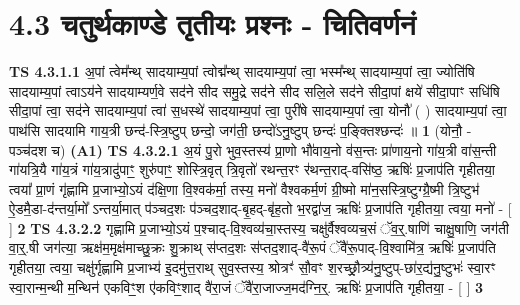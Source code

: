 \documentclass[17pt]{extarticle}
\begin{document}
     \section*{ 4.3      चतुर्थकाण्डे तृतीयः प्रश्नः - चितिवर्णनं }
                                        \textbf{ TS 4.3.1.1} \newline
                  अ॒पां त्वेम᳚न्थ् सादयाम्य॒पां त्वोद्म᳚न्थ् सादयाम्य॒पां त्वा॒ भस्म᳚न्थ् सादयाम्य॒पां त्वा॒ ज्योति॑षि सादयाम्य॒पां त्वाऽय॑ने सादयाम्यर्ण॒वे सद॑ने सीद समु॒द्रे सद॑ने सीद सलि॒ले सद॑ने सीदा॒पां क्षये॑ सीदा॒पाꣳ सधि॑षि सीदा॒पां त्वा॒ सद॑ने सादयाम्य॒पां त्वा॑ स॒धस्थे॑ सादयाम्य॒पां त्वा॒ पुरी॑षे सादयाम्य॒पां त्वा॒ योनौ॑ ( ) सादयाम्य॒पां त्वा॒ पाथ॑सि सादयामि गाय॒त्री छन्द॑-स्त्रि॒ष्टुप् छन्दो॒ जग॑ती॒ छन्दो॑ऽनु॒ष्टुप् छन्दः॑ प॒ङ्क्तिश्छन्दः॑ ॥ \textbf{  1 } \newline
                  \newline
                      (योनौ॒ - पञ्च॑दश च)  \textbf{(A1)} \newline \newline
                                        \textbf{ TS 4.3.2.1} \newline
                  अ॒यं पु॒रो भुव॒स्तस्य॑ प्रा॒णो भौ॑वाय॒नो व॑स॒न्तः प्रा॑णाय॒नो गा॑य॒त्री वा॑स॒न्ती गा॑यत्रि॒यै गा॑य॒त्रं गा॑य॒त्रादु॑पाꣳ॒॒ शुरु॑पाꣳ॒॒ शोस्त्रि॒वृत् त्रि॒वृतो॑ रथन्त॒रꣳ र॑थन्त॒राद्-वसि॑ष्ठ॒ ऋषिः॑ प्र॒जाप॑ति गृहीतया॒ त्वया᳚ प्रा॒णं गृ॑ह्णामि प्र॒जाभ्यो॒ऽयं द॑क्षि॒णा वि॒श्वक॑र्मा॒ तस्य॒ मनो॑ वैश्वकर्म॒णं ग्री॒ष्मो मा॑न॒सस्त्रि॒ष्टुग्ग्रै॒ष्मी त्रि॒ष्टुभ॑ ऐ॒डमै॒डा-द॑न्तर्या॒मो᳚ ऽन्तर्या॒मात् प॑ञ्चद॒शः प॑ञ्चद॒शाद्-बृ॒हद्-बृ॑ह॒तो भ॒रद्वा॑ज॒ ऋषिः॑ प्र॒जाप॑ति गृहीतया॒ त्वया॒ मनो॑ - [  ] \textbf{  2} \newline
                  \newline
                                \textbf{ TS 4.3.2.2} \newline
                  गृह्णामि प्र॒जाभ्यो॒ऽयं प॒श्चाद्-वि॒श्वव्य॑चा॒स्तस्य॒ चक्षु॑र्वैश्वव्यच॒सं ॅव॒र्॒.षाणि॑ चाक्षु॒षाणि॒ जग॑ती वा॒र्॒.षी जग॑त्या॒ ऋक्ष॑म॒मृक्ष॑माच्छु॒क्रः शु॒क्राथ् स॑प्तद॒शः स॑प्तद॒शाद्-वै॑रू॒पं ॅवै॑रू॒पाद्-वि॒श्वामि॑त्र॒ ऋषिः॑ प्र॒जाप॑ति गृहीतया॒ त्वया॒ चक्षु॑र्गृह्णामि प्र॒जाभ्य॑ इ॒दमु॑त्त॒राथ् सुव॒स्तस्य॒ श्रोत्रꣳ॑ सौ॒वꣳ श॒रच्छ्रौ॒त्र्य॑नु॒ष्टुप्-छा॑र॒द्य॑नु॒ष्टुभः॑ स्वा॒रꣳ स्वा॒रान्म॒न्थी म॒न्थिन॑ एकविꣳ॒॒श ए॑कविꣳ॒॒शाद् वै॑रा॒जं ॅवै॑रा॒जाज्ज॒मद॑ग्नि॒र्॒. ऋषिः॑ प्र॒जाप॑ति गृहीतया॒ - [  ] \textbf{  3} \newline
\end{document}
